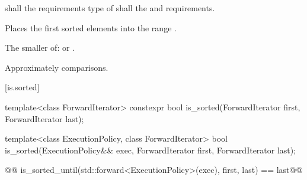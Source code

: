 \begin{itemdescr}
\pnum
\requires
{}
 shall  the
 requirements  type of  shall
 the
 and
 requirements.

\pnum
\effects
Places the first
sorted elements into the range
.

\pnum
\returns
The smaller of:
 or
.

\pnum
\complexity
Approximately
comparisons.
\end{itemdescr}


[is.sorted]{}

%
\begin{itemdecl}
template<class ForwardIterator>
  constexpr bool is_sorted(ForwardIterator first, ForwardIterator last);
\end{itemdecl}

\begin{itemdescr}
\pnum
\removed{\returns} 
\end{itemdescr}

%
\begin{itemdecl}
template<class ExecutionPolicy, class ForwardIterator>
  bool is_sorted(ExecutionPolicy&& exec,
                 ForwardIterator first, ForwardIterator last);
\end{itemdecl}

\begin{itemdescr}
\pnum
\removed{\returns}
\begin{codeblock}
@@ is_sorted_until(std::forward<ExecutionPolicy>(exec), first, last) == last@\added{;}@
\end{codeblock}
\end{itemdescr}

